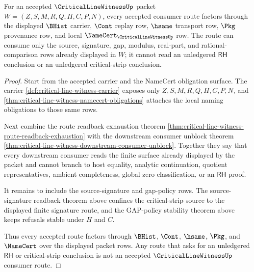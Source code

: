 \begin{theorem}
\label{thm:critical-line-witness-namecert-route-exhaustion}
For an accepted $\CriticalLineWitnessUp$ packet $W=(Z,S,M,R,Q,H,C,P,N)$, every accepted consumer route factors through the displayed $\BHist$ carrier, $\Cont$ replay row, $\hsame$ transport row, $\Pkg$ provenance row, and local $\NameCert_{\CriticalLineWitnessUp}$ row. The route can consume only the source, signature, gap, modulus, real-part, and rational-comparison rows already displayed in $W$; it cannot read an unledgered $\mathsf{RH}$ conclusion or an unledgered critical-strip conclusion.
\end{theorem}
\begin{proof}
Start from the accepted carrier and the NameCert obligation surface. The carrier \autoref{def:critical-line-witness-carrier} exposes only $Z,S,M,R,Q,H,C,P,N$, and \autoref{thm:critical-line-witness-namecert-obligations} attaches the local naming obligations to those same rows.

Next combine the route readback exhaustion theorem \autoref{thm:critical-line-witness-route-readback-exhaustion} with the downstream consumer unblock theorem \autoref{thm:critical-line-witness-downstream-consumer-unblock}. Together they say that every downstream consumer reads the finite surface already displayed by the packet and cannot branch to host equality, analytic continuation, quotient representatives, ambient completeness, global zero classification, or an $\mathsf{RH}$ proof.

It remains to include the source-signature and gap-policy rows. The source-signature readback theorem above confines the critical-strip source to the displayed finite signature route, and the GAP-policy stability theorem above keeps refusals stable under $H$ and $C$.

Thus every accepted route factors through $\BHist$, $\Cont$, $\hsame$, $\Pkg$, and $\NameCert$ over the displayed packet rows. Any route that asks for an unledgered $\mathsf{RH}$ or critical-strip conclusion is not an accepted $\CriticalLineWitnessUp$ consumer route.
\end{proof}
